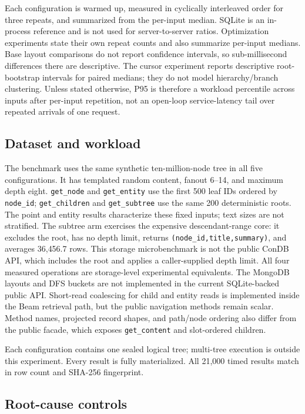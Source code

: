 \documentclass[10pt]{article}
\newcommand{\code}[1]{\texttt{#1}}
\begin{document}
Each configuration is warmed up, measured in cyclically interleaved order for
three repeats, and summarized from the per-input median. SQLite is an
in-process reference and is not used for server-to-server ratios.
Optimization experiments state their own repeat counts and also summarize
per-input medians. Base layout comparisons do not report confidence intervals,
so sub-millisecond differences there are descriptive. The cursor experiment
reports descriptive root-bootstrap intervals for paired medians; they do not
model hierarchy/branch clustering. Unless stated otherwise, P95 is therefore a
workload percentile across inputs after per-input repetition, not an
open-loop service-latency tail over repeated arrivals of one request.

\subsection{Dataset and workload}

The benchmark uses the same synthetic ten-million-node tree in all five
configurations. It has templated random content, fanout 6--14, and maximum depth
eight.
\code{get\_node} and \code{get\_entity} use the first 500 leaf IDs ordered by
\code{node\_id}; \code{get\_children} and \code{get\_subtree} use the same 200
deterministic roots. The point and entity results characterize these fixed
inputs; text sizes are not stratified. The subtree arm exercises the expensive
descendant-range core: it excludes the root, has no depth limit, returns
\code{(node\_id,title,summary)}, and averages 36{,}456.7 rows.
This storage microbenchmark is not the public ConDB API, which includes the root
and applies a caller-supplied depth limit. All four measured operations are
storage-level experimental equivalents. The MongoDB layouts and DFS buckets
are not implemented in the current SQLite-backed public API. Short-read
coalescing for child and entity reads is implemented inside the Beam retrieval
path, but the public navigation methods remain scalar. Method names, projected
record shapes, and path/node ordering also differ from the public facade, which exposes
\code{get\_content} and slot-ordered children.

Each configuration contains one sealed logical tree; multi-tree execution is
outside this experiment. Every result is fully materialized. All 21{,}000 timed
results match in row count and SHA-256 fingerprint.

\subsection{Root-cause controls}
\end{document}
